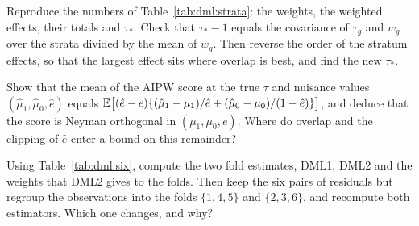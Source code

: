 \begin{exercises}
\item\label{ex:ch04:9} Reproduce the numbers of Table~\ref{tab:dml:strata}: the weights, the weighted effects, their totals and $\tau_*$. Check that $\tau_* - 1$ equals the covariance of $\tau_g$ and $w_g$ over the strata divided by the mean of $w_g$. Then reverse the order of the stratum effects, so that the largest effect sits where overlap is best, and find the new $\tau_*$.
\item\label{ex:ch04:10} Show that the mean of the AIPW score at the true $\tau$ and nuisance values $(\hat\mu_1, \hat\mu_0, \hat e)$ equals $\mathbb{E}\bigl[(\hat e - e)\{(\hat\mu_1 - \mu_1)/\hat e + (\hat\mu_0 - \mu_0)/(1 - \hat e)\}\bigr]$, and deduce that the score is Neyman orthogonal in $(\mu_1, \mu_0, e)$. Where do overlap and the clipping of $\hat e$ enter a bound on this remainder?
\item\label{ex:ch04:11} Using Table~\ref{tab:dml:six}, compute the two fold estimates, DML1, DML2 and the weights that DML2 gives to the folds. Then keep the six pairs of residuals but regroup the observations into the folds $\{1, 4, 5\}$ and $\{2, 3, 6\}$, and recompute both estimators. Which one changes, and why?
\end{exercises}
